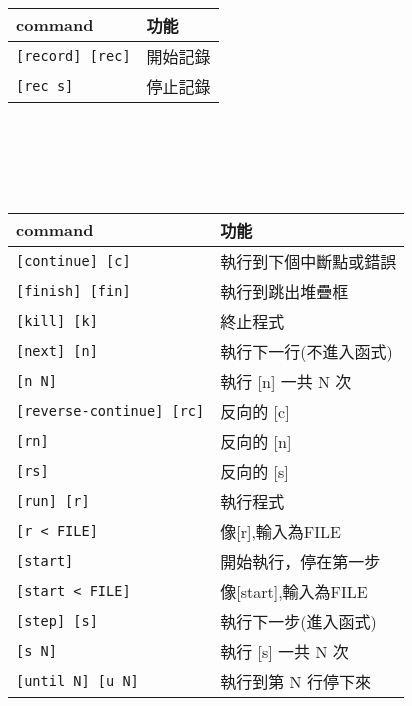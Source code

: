 \begin{center}
     \\
    \begin{tabular}{|p{2.7cm}|p{2.7cm}|}
        \hline
        command                         & 功能 \\
        \hline
        \verb|[record] [rec]|           & 開始記錄 \\
        \verb|[rec s]|                  & 停止記錄 \\
        \hline
    \end{tabular} \\
    \hspace{\fill} \\
    \hspace{\fill} \\

     \\
    \begin{tabular}{|p{2.7cm}|p{2.7cm}|}
        \hline
        command                         & 功能 \\
        \hline
        \verb|[continue] [c]|           & 執行到下個中斷點或錯誤 \\
        \verb|[finish] [fin]|           & 執行到跳出堆疊框 \\
        \verb|[kill] [k]|               & 終止程式 \\
        \verb|[next] [n]|               & 執行下一行(不進入函式) \\
        \verb|[n N]|                    & 執行 [n] 一共 N 次 \\
        \verb|[reverse-continue] [rc]|  & 反向的 [c] \\
        \verb|[rn]|                     & 反向的 [n] \\
        \verb|[rs]|                     & 反向的 [s] \\
        \verb|[run] [r]|                & 執行程式 \\
        \verb|[r < FILE]|               & 像[r],輸入為FILE \\
        \verb|[start]|                  & 開始執行，停在第一步 \\
        \verb|[start < FILE]|           & 像[start],輸入為FILE \\
        \verb|[step] [s]|               & 執行下一步(進入函式) \\
        \verb|[s N]|                    & 執行 [s] 一共 N 次 \\
        \verb|[until N] [u N]|          & 執行到第 N 行停下來 \\
        \hline
    \end{tabular} \\
    \hspace{\fill} \\
    \hspace{\fill} \\


\end{center}
